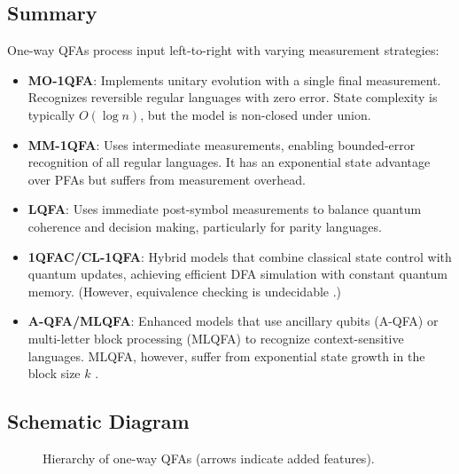 \subsection{Summary}
One-way QFAs process input left-to-right with varying measurement strategies:
\begin{itemize}
    \item \textbf{MO-1QFA}: Implements unitary evolution with a single final measurement. Recognizes reversible regular languages with zero error. State complexity is typically $O(\log n)$, but the model is non-closed under union.
    \item \textbf{MM-1QFA}: Uses intermediate measurements, enabling bounded-error recognition of all regular languages. It has an exponential state advantage over PFAs but suffers from measurement overhead.
    \item \textbf{LQFA}: Uses immediate post-symbol measurements to balance quantum coherence and decision making, particularly for parity languages.
    \item \textbf{1QFAC/CL-1QFA}: Hybrid models that combine classical state control with quantum updates, achieving efficient DFA simulation with constant quantum memory. (However, equivalence checking is undecidable \cite{hirvensalo2008}.)
    \item \textbf{A-QFA/MLQFA}: Enhanced models that use ancillary qubits (A-QFA) or multi-letter block processing (MLQFA) to recognize context-sensitive languages. MLQFA, however, suffer from exponential state growth in the block size $k$ \cite{ravikumar2003}.
\end{itemize}

\subsection{Schematic Diagram}
\begin{figure}[ht]
\centering
{}
\caption{Hierarchy of one-way QFAs (arrows indicate added features).}
\label{fig:one_way_hierarchy}
\end{figure}

